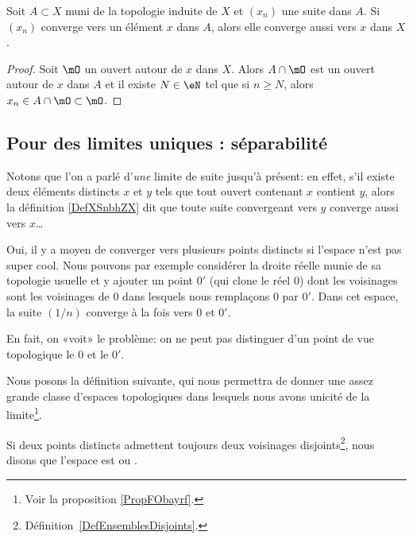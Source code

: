 \begin{lemma}   \label{LemPESaiVw}
    Soit \( A\subset X\) muni de la topologie induite de \( X\) et \( (x_n)\) une suite dans \( A\). Si \( (x_n) \) converge vers un élément \( x \) dans \(A \), alors elle converge aussi vers \(x \) dans \( X \).
\end{lemma}

\begin{proof}
    Soit \( \mO\) un ouvert autour de \( x\) dans \( X\). Alors \( A\cap\mO\) est un ouvert autour de \( x\) dans \( A\) et il existe \( N\in \eN\) tel que si \( n\geq N\), alors \( x_n\in A\cap\mO\subset\mO\).
\end{proof}

\subsection{Pour des limites uniques : séparabilité}

Notons que l'on a parlé d'\emph{une} limite de suite jusqu'à présent: en effet, s'il existe deux éléments distincts $x$ et $y$ tels que tout ouvert contenant $x$ contient $y$, alors la définition \ref{DefXSnbhZX} dit que toute suite convergeant vers $y$ converge aussi vers $x$\dots


\begin{example} \label{EXooSHKAooZQEVLB}
    Oui, il y a moyen de converger vers plusieurs points distincts si l'espace n'est pas super cool. Nous pouvons par exemple \cite{EJVQuas} considérer la droite réelle munie de sa topologie usuelle et y ajouter un point $0'$ (qui clone le réel $0$) dont les voisinages sont les voisinages de $0$ dans lesquels nous remplaçons $0$ par $0'$. Dans cet espace, la suite $(1/n)$ converge à la fois vers $0$ et $0'$.

    En fait, on «voit» le problème: on ne peut pas distinguer d'un point de vue topologique le $0$ et le $0'$.
\end{example}

Nous posons la définition suivante, qui nous permettra de donner une assez grande classe d'espaces topologiques dans lesquels nous avons unicité de la limite\footnote{Voir la proposition \ref{PropFObayrf}.}.
\begin{definition}  \label{DefYFmfjjm}\label{DefWEOTrVl}
    Si deux points distincts admettent toujours deux voisinages disjoints\footnote{Définition~\ref{DefEnsemblesDisjoints}.}, nous disons que l'espace est  ou .
\end{definition}

